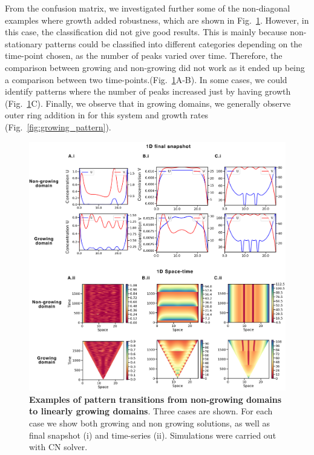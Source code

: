 From the confusion matrix, we investigated further some of the non-diagonal examples where growth added robustness, which are shown in Fig.~\ref{fig:interesting_cases_edgegrowth2}.
 However, in this case, the classification did not give good results.
This is mainly because non-stationary patterns could be classified into different categories depending on the time-point chosen, as the number of peaks varied over time.
Therefore, the comparison between growing and non-growing did not work as it ended up being a comparison between two time-points.(Fig.~\ref{fig:interesting_cases_edgegrowth2}A-B).
In some cases, we could identify patterns where the number of peaks increased just by having growth (Fig.~\ref{fig:interesting_cases_edgegrowth2}C).
Finally, we observe that in growing domains, we generally observe outer ring addition in for this system and growth rates (Fig.~\ref{fig:growing_pattern}).
\begin{figure}[H] %

    \centering
    \begin{adjustbox}{center}
        \includegraphics[width=1\textwidth]{chapters/Chapter 1/interesting_cases_edgegrowth2} %
    \end{adjustbox}
    \caption{\textbf{Examples of pattern transitions from non-growing domains to linearly growing domains}. Three cases are shown. For each case we show both growing and non growing solutions, as well as final snapshot (i) and time-series (ii). Simulations were carried out with CN solver.}
    \label{fig:interesting_cases_edgegrowth2}
\end{figure}
